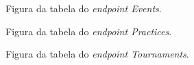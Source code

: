 \begin{figure}[h]
	\begin{center}
	\end{center}
	\caption{Figura da tabela do \textit{endpoint Events}.}\label{fig:events}
\end{figure}
\begin{figure}[h]
	\begin{center}
	\end{center}
	\caption{Figura da tabela do \textit{endpoint Practices}.}\label{fig:practices}
\end{figure}
\newpage
\begin{figure}[h]
	\begin{center}
	\end{center}
	\caption{Figura da tabela do \textit{endpoint Tournaments}.}\label{fig:tournaments}
\end{figure}
